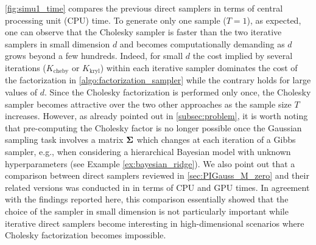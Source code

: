 \documentclass[nohypdvips,onefignum,onetabnum]{siamart171218}
\begin{document}
\cref{fig:simu1_time} compares the previous direct samplers in terms of central processing unit (CPU) time. To generate only one sample ($T=1$), as expected, one can observe that the Cholesky sampler is faster than the two iterative samplers in small dimension $d$ and becomes computationally demanding as $d$ grows beyond a few hundreds.
Indeed, for small $d$ the cost implied by several iterations ($K_{\mathrm{cheby}}$ or $K_{\mathrm{kryl}}$) within each iterative sampler dominates the cost of the factorization in \cref{algo:factorization_sampler} while the contrary holds for large values of $d$.
Since the Cholesky factorization is performed only once, the Cholesky sampler becomes attractive over the two other approaches as the sample size $T$ increases.
However, as already pointed out in \cref{subsec:problem}, it is worth noting that pre-computing the Cholesky factor is no longer possible once the Gaussian sampling task involves a matrix $\mathbf{\Sigma}$ which changes at each iteration of a Gibbs sampler, e.g., when considering a hierarchical Bayesian model with unknown hyperparameters (see Example \ref{ex:bayesian_ridge}).
We also point out that a comparison between direct samplers reviewed in \cref{sec:PIGauss_M_zero} and their related versions was conducted in \cite{Aune2013} in terms of CPU and GPU times.
In agreement with the findings reported here, this comparison essentially showed that the choice of the sampler in small dimension is not particularly important while iterative direct samplers become interesting in high-dimensional scenarios where Cholesky factorization becomes impossible.
%
\end{document}
